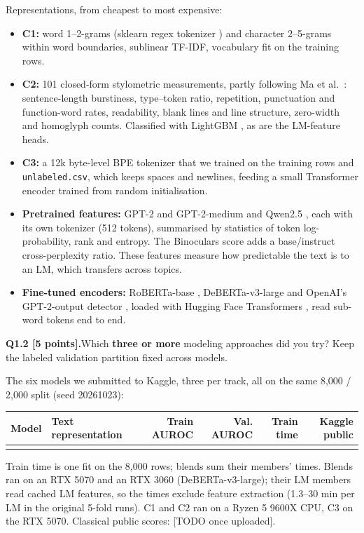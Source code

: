 \documentclass[11pt,letterpaper]{article}
\newcommand{\question}[2]{\needspace{4\baselineskip}\par\addvspace{0.45em}\noindent\textbf{#1}\quad #2\par\nobreak\vspace{0.1em}}
\newcommand{\smallnote}[1]{{\small\color{muted}#1}}
\begin{document}
Representations, from cheapest to most expensive:
\begin{itemize}
\item \textbf{C1:} word 1--2-grams (sklearn regex tokenizer \cite{sklearn}) and character 2--5-grams within word boundaries, sublinear TF-IDF, vocabulary fit on the training rows.
\item \textbf{C2:} 101 closed-form stylometric measurements, partly following Ma et al.\ \cite{ma2023}: sentence-length burstiness, type--token ratio, repetition, punctuation and function-word rates, readability, blank lines and line structure, zero-width and homoglyph counts. Classified with LightGBM \cite{lightgbm}, as are the LM-feature heads.
\item \textbf{C3:} a 12k byte-level BPE tokenizer \cite{bpe} that we trained on the training rows and \texttt{unlabeled.csv}, which keeps spaces and newlines, feeding a small Transformer encoder \cite{transformer} trained from random initialisation.
\item \textbf{Pretrained features:} GPT-2 and GPT-2-medium \cite{gpt2} and Qwen2.5 \cite{qwen25}, each with its own tokenizer (512 tokens), summarised by statistics of token log-probability, rank and entropy. The Binoculars score \cite{binoculars} adds a base/instruct cross-perplexity ratio. These features measure how predictable the text is to an LM, which transfers across topics.
\item \textbf{Fine-tuned encoders:} RoBERTa-base \cite{roberta}, DeBERTa-v3-large \cite{debertav3} and OpenAI's GPT-2-output detector \cite{solaiman2019}, loaded with Hugging Face Transformers \cite{hftransformers}, read sub-word tokens end to end.
\end{itemize}

\question{Q1.2 [5 points].}{Which \textbf{three or more} modeling approaches did you try? Keep the labeled validation partition fixed across models.}
The six models we submitted to Kaggle, three per track, all on the same 8,000 / 2,000 split (seed 20261023):

{\small\begin{tabularx}{\linewidth}{@{}>{\RaggedRight}p{0.9in}Yrrrr@{}}\toprule
Model & Text representation & Train AUROC & Val. AUROC & Train time & Kaggle public \\ \midrule
{}
\bottomrule\end{tabularx}}
\smallnote{Train time is one fit on the 8,000 rows; blends sum their members' times. Blends ran on an RTX 5070 and an RTX 3060 (DeBERTa-v3-large); their LM members read cached LM features, so the times exclude feature extraction (1.3--30 min per LM in the original 5-fold runs). C1 and C2 ran on a Ryzen 5 9600X CPU, C3 on the RTX 5070. Classical public scores: [TODO once uploaded].}
\end{document}

